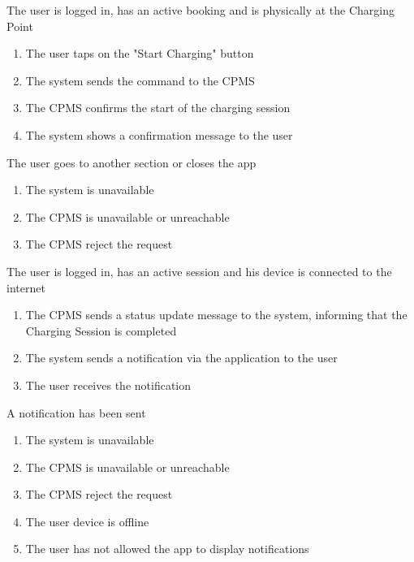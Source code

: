 \begin{enumerate}
	{The user is logged in, has an active booking and is physically at the Charging Point}
	{
	\begin{enumerate}[1.]
	\item The user taps on the "Start Charging" button
	\item The system sends the command to the CPMS
	\item The CPMS confirms the start of the charging session
	\item The system shows a confirmation message to the user
	\end{enumerate}
	}
	{The user goes to another section or closes the app}
	{
	\begin{enumerate}[1.]
	\item The system is unavailable
	\item The CPMS is unavailable or unreachable
	\item The CPMS reject the request
	\end{enumerate}
	}
	
	{The user is logged in, has an active session and his device is connected to the internet}
	{
	\begin{enumerate}[1.]
	\item The CPMS sends a status update message to the system, informing that the Charging Session is completed
	\item The system sends a notification via the application to the user
	\item The user receives the notification
	\end{enumerate}
	}
	{A notification has been sent}
	{
	\begin{enumerate}[1.]
	\item The system is unavailable
	\item The CPMS is unavailable or unreachable
	\item The CPMS reject the request
	\item The user device is offline
	\item The user has not allowed the app to display notifications
	\end{enumerate}
	}
	

\end{enumerate}
